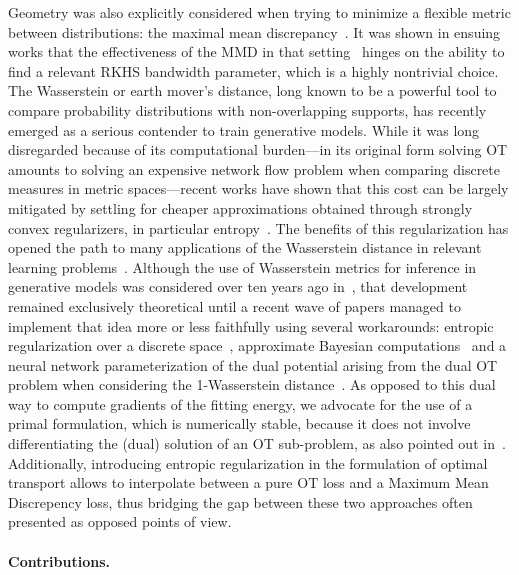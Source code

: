 Geometry was also explicitly considered when trying to minimize a flexible metric between distributions: the maximal mean discrepancy~\cite{gretton2007kernel}. It was shown in ensuing works that the effectiveness of the MMD in that setting~\cite{li2015generative,MMD-GAN} hinges on the ability to find a relevant RKHS bandwidth parameter, which is a highly nontrivial choice.
%
The Wasserstein or earth mover's distance, long known to be a powerful tool to compare probability distributions with non-overlapping supports, has recently emerged as a serious contender to train generative models.
% 
While it was long disregarded because of its computational burden---in its original form solving OT amounts to solving an expensive network flow problem when comparing discrete measures in metric spaces---recent works have shown that this cost can be largely mitigated by settling for cheaper approximations obtained through strongly convex regularizers, in particular entropy~\cite{CuturiSinkhorn,2016-genevay-nips}. The benefits of this regularization has opened the path to many applications of the Wasserstein distance in relevant learning problems~\cite{courty2014domain,2015-Frogner,NIPS2016_6139,pmlr-v51-rolet16}. 
%
Although the use of Wasserstein metrics for inference in generative models was considered over ten years ago in~\cite{bassetti2006minimum}, that development remained exclusively theoretical until a recent wave of papers managed to implement that idea more or less faithfully using several workarounds: entropic regularization over a discrete space~\cite{montavon2016wasserstein}, approximate Bayesian computations~\cite{bernton2017inference} and a neural network parameterization of the dual potential arising from the dual OT problem when considering the 1-Wasserstein distance~\cite{WassersteinGAN}.
%
As opposed to this dual way to compute gradients of the fitting energy, we advocate for the use of a primal formulation, which is numerically stable, because it does not involve differentiating the (dual) solution of an OT sub-problem, as also pointed out in~\cite{Bousquet2017}.
%
Additionally, introducing entropic regularization in the formulation of optimal transport allows to interpolate between a pure OT loss and a Maximum Mean Discrepency loss, thus bridging the gap between these two approaches often presented as opposed points of view.


\paragraph{Contributions.}

